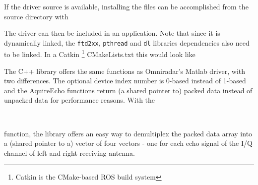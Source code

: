 If the driver source is available, installing the files can be
accomplished from the source directory with

\begin{Shaded}
\begin{Highlighting}[]
\KeywordTok{\&\&} 
\end{Highlighting}
\end{Shaded}

The driver can then be included in an application. Note that since it is
dynamically linked, the \texttt{ftd2xx}, \texttt{pthread} and
\texttt{dl} libraries dependencies also need to be linked. In a Catkin
\footnote{Catkin is the CMake-based ROS build system} CMakeLists.txt
this would look like

\begin{Shaded}
\begin{Highlighting}[]
\NormalTok{(}
\NormalTok{)}
\end{Highlighting}
\end{Shaded}

The C++ library offers the same functions as Omniradar's Matlab driver,
with two differences. The optional device index number is 0-based
instead of 1-based and the AquireEcho functions return (a shared pointer
to) packed data instead of unpacked data for performance reasons. With
the

\begin{Shaded}
\begin{Highlighting}[]
 \NormalTok{ > > >}\\
\end{Highlighting}
\end{Shaded}

function, the library offers an easy way to demultiplex the packed data
array into a (shared pointer to a) vector of four vectors - one for each
echo signal of the I/Q channel of left and right receiving antenna.

